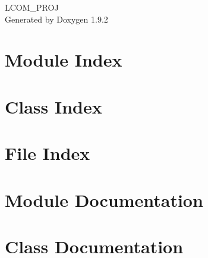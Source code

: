 \documentclass[twoside]{book}
\newcommand{\+}{\discretionary{\mbox{\scriptsize$\hookleftarrow$}}{}{}}
\newcommand{\clearemptydoublepage}{%
    \newpage{\pagestyle{empty}\cleardoublepage}%
  }
\begin{document}
  \raggedbottom
    \hypersetup{pageanchor=false,
                bookmarksnumbered=true,
                pdfencoding=unicode
               }
  \begin{titlepage}
  \vspace*{7cm}
  \begin{center}%
  {\Large LCOM\+\_\+\+PROJ}\\
  \vspace*{1cm}
  {\large Generated by Doxygen 1.9.2}\\
  \end{center}
  \end{titlepage}
  \clearemptydoublepage
  \tableofcontents
  \clearemptydoublepage
  \hypersetup{pageanchor=true}
\chapter{Module Index}

\chapter{Class Index}

\chapter{File Index}

\chapter{Module Documentation}




















\chapter{Class Documentation}










\end{document}
